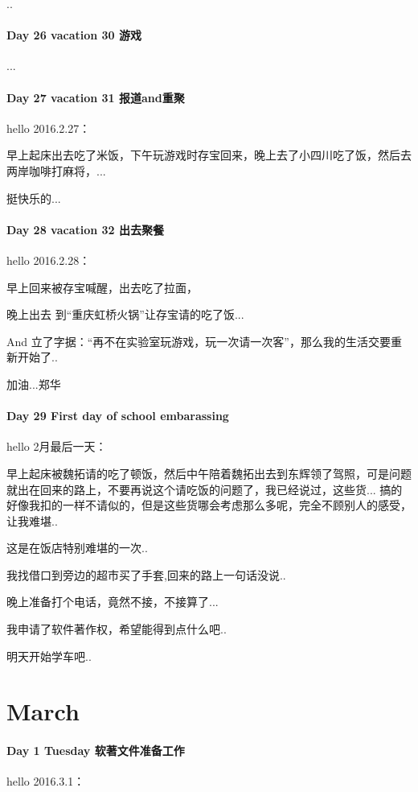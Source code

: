 \documentclass[UTF8,a4paper,8pt]{ctexbook}
\begin{document}
	 	 ..
 	 \paragraph{Day 26  vacation 30    \quad  游戏   }
	 	 ...
 	 \paragraph{Day 27  vacation 31    \quad  报道and重聚}
	 	 hello 2016.2.27：
	 	 
	 	 早上起床出去吃了米饭，下午玩游戏时存宝回来，晚上去了小四川吃了饭，然后去两岸咖啡打麻将，...
	 	 
	 	 挺快乐的...
 	 \paragraph{Day 28  vacation 32    \quad   出去聚餐}
	 	 hello 2016.2.28：
	 	 
	 	 早上回来被存宝喊醒，出去吃了拉面，
	 	 
	 	 晚上出去 到“重庆虹桥火锅”让存宝请的吃了饭...
	 	 
	 	 And 立了字据：“再不在实验室玩游戏，玩一次请一次客”，那么我的生活交要重新开始了..
	 	 
	 	加油...郑华
 	 \paragraph{Day 29   First day of school   \quad    embarassing }   
		 hello 2月最后一天：
		 
		 早上起床被魏拓请的吃了顿饭，然后中午陪着魏拓出去到东辉领了驾照，可是问题就出在回来的路上，不要再说这个请吃饭的问题了，我已经说过，这些货... 搞的好像我扣的一样不请似的，但是这些货哪会考虑那么多呢，完全不顾别人的感受，让我难堪..
		 
		 这是在饭店特别难堪的一次..
		 
		 我找借口到旁边的超市买了手套,回来的路上一句话没说..
		 
		 晚上准备打个电话，竟然不接，不接算了...
		 
		 我申请了软件著作权，希望能得到点什么吧..
		 
		 明天开始学车吧..
		  \newpage
 \section*{March}
 	 \paragraph{Day 1   Tuesday   \quad    软著文件准备工作   }
	 	 hello 2016.3.1：
	 	 
\end{document}
